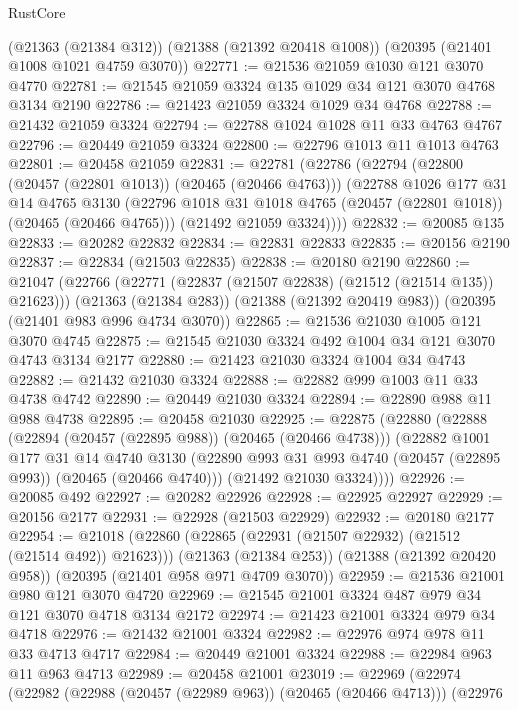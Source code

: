 \begin{lexlean}{RustCore}
\begin{coremodule}
    (@21363 (@21384 @312))
    (@21388 (@21392 @20418 @1008))
    (@20395 (@21401 @1008 @1021 @4759 @3070))
@22771 := @21536 @21059 @1030 @121 @3070 @4770
@22781 := @21545 @21059 @3324 @135 @1029 @34 @121 @3070 @4768 @3134 @2190
@22786 := @21423 @21059 @3324 @1029 @34 @4768
@22788 := @21432 @21059 @3324
@22794 := @22788 @1024 @1028 @11 @33 @4763 @4767
@22796 := @20449 @21059 @3324
@22800 := @22796 @1013 @11 @1013 @4763
@22801 := @20458 @21059
@22831 := @22781
    (@22786
      (@22794
        (@22800 (@20457 (@22801 @1013)) (@20465 (@20466 @4763)))
        (@22788
          @1026
          @177
          @31
          @14
          @4765
          @3130
          (@22796 @1018 @31 @1018 @4765 (@20457 (@22801 @1018)) (@20465 (@20466 @4765)))
          (@21492 @21059 @3324))))
@22832 := @20085 @135
@22833 := @20282 @22832
@22834 := @22831 @22833
@22835 := @20156 @2190
@22837 := @22834 (@21503 @22835)
@22838 := @20180 @2190
@22860 := @21047
    (@22766 (@22771 (@22837 (@21507 @22838) (@21512 (@21514 @135)) @21623)))
    (@21363 (@21384 @283))
    (@21388 (@21392 @20419 @983))
    (@20395 (@21401 @983 @996 @4734 @3070))
@22865 := @21536 @21030 @1005 @121 @3070 @4745
@22875 := @21545 @21030 @3324 @492 @1004 @34 @121 @3070 @4743 @3134 @2177
@22880 := @21423 @21030 @3324 @1004 @34 @4743
@22882 := @21432 @21030 @3324
@22888 := @22882 @999 @1003 @11 @33 @4738 @4742
@22890 := @20449 @21030 @3324
@22894 := @22890 @988 @11 @988 @4738
@22895 := @20458 @21030
@22925 := @22875
    (@22880
      (@22888
        (@22894 (@20457 (@22895 @988)) (@20465 (@20466 @4738)))
        (@22882
          @1001
          @177
          @31
          @14
          @4740
          @3130
          (@22890 @993 @31 @993 @4740 (@20457 (@22895 @993)) (@20465 (@20466 @4740)))
          (@21492 @21030 @3324))))
@22926 := @20085 @492
@22927 := @20282 @22926
@22928 := @22925 @22927
@22929 := @20156 @2177
@22931 := @22928 (@21503 @22929)
@22932 := @20180 @2177
@22954 := @21018
    (@22860 (@22865 (@22931 (@21507 @22932) (@21512 (@21514 @492)) @21623)))
    (@21363 (@21384 @253))
    (@21388 (@21392 @20420 @958))
    (@20395 (@21401 @958 @971 @4709 @3070))
@22959 := @21536 @21001 @980 @121 @3070 @4720
@22969 := @21545 @21001 @3324 @487 @979 @34 @121 @3070 @4718 @3134 @2172
@22974 := @21423 @21001 @3324 @979 @34 @4718
@22976 := @21432 @21001 @3324
@22982 := @22976 @974 @978 @11 @33 @4713 @4717
@22984 := @20449 @21001 @3324
@22988 := @22984 @963 @11 @963 @4713
@22989 := @20458 @21001
@23019 := @22969
    (@22974
      (@22982
        (@22988 (@20457 (@22989 @963)) (@20465 (@20466 @4713)))
        (@22976

\end{coremodule}
\end{lexlean}
